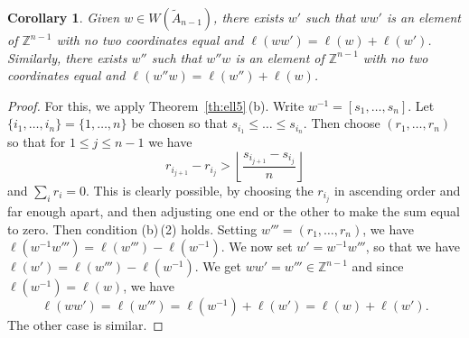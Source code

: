 \documentclass[12pt]{amsart}
\renewcommand{\le}{\leqslant}
\newcommand{\bZ}{{\mathbb{Z}}}
\numberwithin{equation}{section}
\newtheorem{corollary}[equation]{Corollary}
\theoremstyle{definition}
\begin{document}
\begin{corollary}\label{co:w'''}
Given $w\in W(\tilde A_{n-1})$, there exists $w'$ such that
$ww'$ is an element of $\bZ^{n-1}$ with no two coordinates equal and
$\ell(ww')=\ell(w)+\ell(w')$. Similarly, there exists 
$w''$ such that $w''w$ is an element of $\bZ^{n-1}$ with no  two
coordinates equal and $\ell(w''w)=\ell(w'')+\ell(w)$.
\end{corollary}
\begin{proof}
For this, we apply Theorem~\ref{th:ell5}\,(b). Write
$w^{-1}=[s_1,\dots,s_n]$. Let $\{i_1,\dots,i_n\}=\{1,\dots,n\}$ be
chosen so that $s_{i_1}\le \dots\le s_{i_n}$. Then
choose $(r_1,\dots,r_n)$ so that for $1\le j\le n-1$ we have
\[ r_{i_{j+1}}-r_{i_j} >
  \left\lfloor\frac{s_{i_{j+1}}-s_{i_j}}{n}\right\rfloor \]
and $\sum_ir_i=0$. This is clearly possible, by choosing the $r_{i_j}$
in ascending order and far enough apart, and then adjusting one end or
the other to make the sum equal to zero. Then condition (b)\,(2) holds.
Setting $w'''=(r_1,\dots,r_n)$, we have
$\ell(w^{-1}w''')=\ell(w''')-\ell(w^{-1})$. We now set $w'=w^{-1}w'''$, so
that we have $\ell(w')=\ell(w''')-\ell(w^{-1})$. 
We get $ww'=w'''\in\bZ^{n-1}$ and since $\ell(w^{-1})=\ell(w)$, we have
\[  \ell(ww')=\ell(w''')=\ell(w^{-1})+\ell(w')=\ell(w)+\ell(w'). \] 
The other case is similar.
\end{proof}
\end{document}
